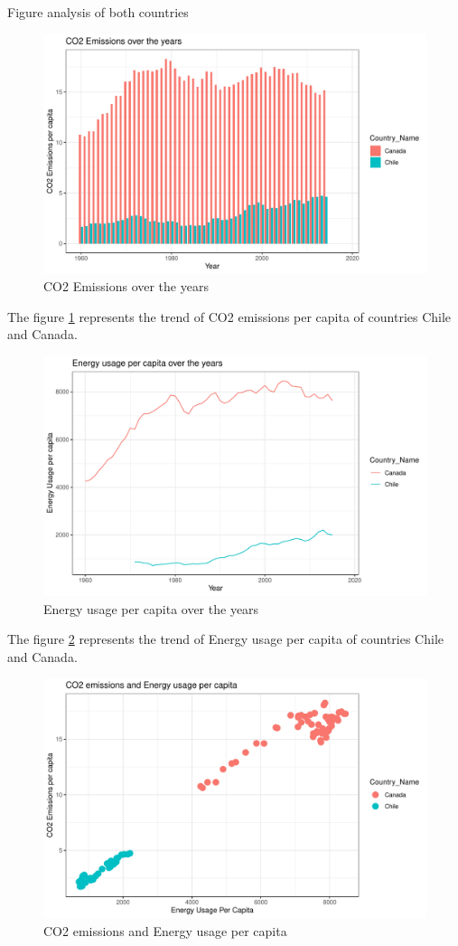 \documentclass[11pt,a4paper,]{article}
\begin{document}
Figure analysis of both countries

\begin{figure}

{\centering \includegraphics[width=0.5\linewidth]{Figures/emissions-1} 

}

\caption{CO2 Emissions over the years}\label{fig:emissions}
\end{figure}

The figure \ref{fig:emissions} represents the trend of CO2 emissions per capita of countries Chile and Canada.

\begin{figure}

{\centering \includegraphics[width=0.5\linewidth]{Figures/energy-1} 

}

\caption{Energy usage per capita over the years}\label{fig:energy}
\end{figure}

The figure \ref{fig:energy} represents the trend of Energy usage per capita of countries Chile and Canada.

\begin{figure}

{\centering \includegraphics[width=0.5\linewidth]{Figures/plot-1} 

}

\caption{CO2 emissions and Energy usage per capita}\label{fig:plot}
\end{figure}
\end{document}
